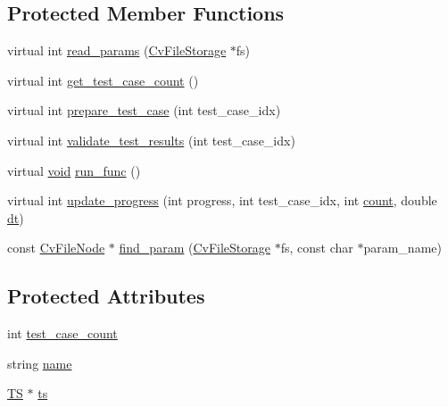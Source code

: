 \subsection*{Protected Member Functions}
\begin{DoxyCompactItemize}
\item 
virtual int \hyperlink{classcvtest_1_1BaseTest_ae8e9fedae8c63b59ffed6d8f059830cc}{read\-\_\-params} (\hyperlink{core_2types__c_8h_a84556d1bb6f1b8b02c04c60246747a7e}{Cv\-File\-Storage} $\ast$fs)
\item 
virtual int \hyperlink{classcvtest_1_1BaseTest_ab2230540aef6b4cc90e05329b80fb0d6}{get\-\_\-test\-\_\-case\-\_\-count} ()
\item 
virtual int \hyperlink{classcvtest_1_1BaseTest_a5f4916a8244afb316ec2515af50db366}{prepare\-\_\-test\-\_\-case} (int test\-\_\-case\-\_\-idx)
\item 
virtual int \hyperlink{classcvtest_1_1BaseTest_a965e3adf864fd002c11a64f1190c5781}{validate\-\_\-test\-\_\-results} (int test\-\_\-case\-\_\-idx)
\item 
virtual \hyperlink{legacy_8hpp_a8bb47f092d473522721002c86c13b94e}{void} \hyperlink{classcvtest_1_1BaseTest_a6f33a9e024184d3e3561c67d0a131656}{run\-\_\-func} ()
\item 
virtual int \hyperlink{classcvtest_1_1BaseTest_a93307e3353a3b5ad254d546578230d88}{update\-\_\-progress} (int progress, int test\-\_\-case\-\_\-idx, int \hyperlink{tracking_8hpp_a88d78b1935cd8bdee70a44eaaf326b1e}{count}, double \hyperlink{core__c_8h_a6349a5196c8b4904789d908389b91671}{dt})
\item 
const \hyperlink{structCvFileNode}{Cv\-File\-Node} $\ast$ \hyperlink{classcvtest_1_1BaseTest_a980c8ef108496cb87691950ba9649d60}{find\-\_\-param} (\hyperlink{core_2types__c_8h_a84556d1bb6f1b8b02c04c60246747a7e}{Cv\-File\-Storage} $\ast$fs, const char $\ast$param\-\_\-name)
\end{DoxyCompactItemize}
\subsection*{Protected Attributes}
\begin{DoxyCompactItemize}
\item 
int \hyperlink{classcvtest_1_1BaseTest_a20ef42b44b55838ddb61c399c9c8407b}{test\-\_\-case\-\_\-count}
\item 
string \hyperlink{classcvtest_1_1BaseTest_aa5dd881caa5023490a723976fe9bcdd8}{name}
\item 
\hyperlink{classcvtest_1_1TS}{T\-S} $\ast$ \hyperlink{classcvtest_1_1BaseTest_ab30930fd0e1878ddc54f335410eef7e5}{ts}
\end{DoxyCompactItemize}


